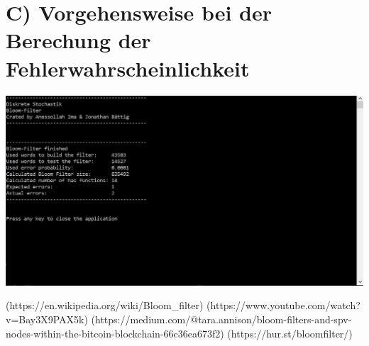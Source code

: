 \documentclass[a4paper, 11pt]{article}
\begin{document}
\section*{C) Vorgehensweise bei der Berechung der Fehlerwahrscheinlichkeit}

\cite{Testsite}
\includegraphics[width=\textwidth]{Program.jpg}

\begin{thebibliography}{9}
 (https://en.wikipedia.org/wiki/Bloom\_filter)
 (https://www.youtube.com/watch?v=Bay3X9PAX5k)
 (https://medium.com/@tara.annison/bloom-filters-and-spv-nodes-within-the-bitcoin-blockchain-66c36ea673f2)
 (https://hur.st/bloomfilter/)
\end{thebibliography}
\end{document}
